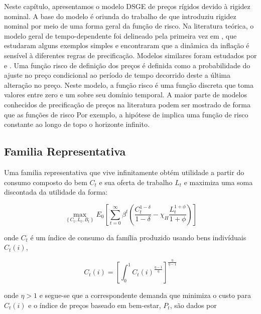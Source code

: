 \documentclass[twoside,a4paper,11pt]{report}
\begin{document}
Neste capítulo, apresentamos o modelo DSGE de preços rígidos devido à rigidez nominal. A base do modelo é oriunda do trabalho de \citet{yao2010aggregate} que introduziu rigidez nominal por meio de uma forma geral da função de risco. Na literatura teórica, o modelo geral de tempo-dependente foi delineado pela primeira vez em \citet{wolman1999sticky}, que estudaram alguns exemplos simples e encontraram que a dinâmica da inflação é sensível à diferentes regras de precificação. Modelos similares foram estudados por \citet{mash2004optimising} e \citet{yao2009cost}. Uma função risco de definição dos preços é definida como a probabilidade do ajuste no preço condicional ao período de tempo decorrido deste a última alteração no preço. Neste modelo, a função risco é uma função discreta que toma valores entre zero e um sobre seu domínio temporal. A maior parte de modelos conhecidos de precificação de preços na literatura podem ser mostrado de forma que as funções de risco Por exemplo, a hipótese de \citet{calvo1983staggered} implica uma função de risco constante ao longo de topo o horizonte infinito.

\subsection*{Familia Representativa}

Uma familia representativa que vive infinitamente obtém utilidade a partir do consumo composto do bem $C_{t}$ e sua oferta de trabalho $L_{t}$ e maximiza uma soma discontada da utilidade da forma:

\begin{equation}\label{eq01en02}
\max _{ \left\{ { C }_{ t },{ L }_{ t },{ B }_{ t } \right\}  }{ { E }_{ 0 }\left[ \sum _{ t=0 }^{ \infty  }{ { \beta  }^{ t }\left( \frac { { C }_{ t }^{ 1-\delta  } }{ 1-\delta  } -{ \chi  }_{ H }\frac { { L }_{ t }^{ 1+\phi  } }{ 1+\phi  }  \right)  }  \right]  } 
\end{equation}

\noindent onde $C_{t}$ é um índice de consumo da família produzido usando bens indivíduais $C_{t}(i)$, 

\begin{equation}\label{eq02en02}
{ C }_{ t }(i)={ \left[ \int _{ 0 }^{ 1 }{ { C }_{ t }{ (i) }^{ \frac { \eta -1 }{ \eta  }  } }  \right]  }^{ \frac { \eta  }{ \eta -1 }  }
\end{equation}

\noindent onde $\eta>1$ e segue-se que a correspondente demanda que minimiza o custo para $C_{t}(i)$ e o índice de preços baseado em bem-estar, $P_{t}$, são dados por
\end{document}
